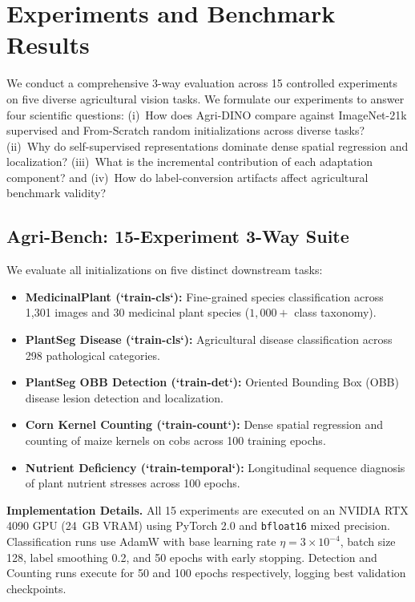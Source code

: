 \documentclass[10pt,twocolumn,letterpaper]{article}
\begin{document}
\section{Experiments and Benchmark Results}

We conduct a comprehensive 3-way evaluation across 15 controlled experiments on five diverse agricultural vision tasks. We formulate our experiments to answer four scientific questions: (i)~How does Agri-DINO compare against ImageNet-21k supervised and From-Scratch random initializations across diverse tasks? (ii)~Why do self-supervised representations dominate dense spatial regression and localization? (iii)~What is the incremental contribution of each adaptation component? and (iv)~How do label-conversion artifacts affect agricultural benchmark validity?

\subsection{Agri-Bench: 15-Experiment 3-Way Suite}

We evaluate all initializations on five distinct downstream tasks:
\begin{itemize}[noitemsep, topsep=2pt]
  \item \textbf{MedicinalPlant (`train-cls`):} Fine-grained species classification across 1,301 images and 30 medicinal plant species ($1,000+$ class taxonomy).
  \item \textbf{PlantSeg Disease (`train-cls`):} Agricultural disease classification across 298 pathological categories.
  \item \textbf{PlantSeg OBB Detection (`train-det`):} Oriented Bounding Box (OBB) disease lesion detection and localization.
  \item \textbf{Corn Kernel Counting (`train-count`):} Dense spatial regression and counting of maize kernels on cobs across 100 training epochs.
  \item \textbf{Nutrient Deficiency (`train-temporal`):} Longitudinal sequence diagnosis of plant nutrient stresses across 100 epochs.
\end{itemize}

\noindent\textbf{Implementation Details.} All 15 experiments are executed on an NVIDIA RTX 4090 GPU (24~GB VRAM) using PyTorch 2.0 and \texttt{bfloat16} mixed precision. Classification runs use AdamW with base learning rate $\eta = 3\!\times\!10^{-4}$, batch size 128, label smoothing 0.2, and 50 epochs with early stopping. Detection and Counting runs execute for 50 and 100 epochs respectively, logging best validation checkpoints.
\end{document}
